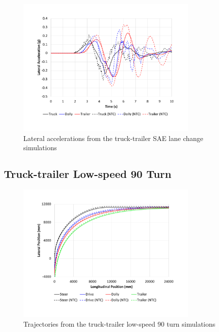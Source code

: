 \begin{figure}[H]
	\centering
	\includegraphics[width=0.8\textwidth]{fig/ntc-truck-trailer_lcd}
	\caption{Lateral accelerations from the truck-trailer SAE lane change simulations}
	\label{figure:ntc-truck-trailer_lcd}
\end{figure}

\subsection{Truck-trailer Low-speed 90\degree{} Turn}\label{appendix:truck-trailer-validation-ls}

\begin{figure}[H]
	\centering
	\includegraphics[width=0.8\textwidth]{fig/ntc-truck-trailer_lsa}
	\caption{Trajectories from the truck-trailer low-speed 90\degree{} turn simulations}
	\label{figure:ntc-truck-trailer_lsa}
\end{figure}

